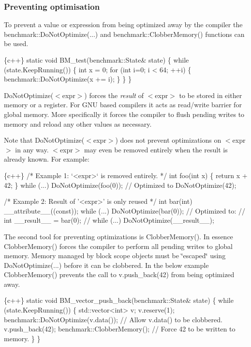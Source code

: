 \subsubsection*{Preventing optimisation}

To prevent a value or expression from being optimized away by the compiler the {\ttfamily benchmark\+::\+Do\+Not\+Optimize(...)} and {\ttfamily benchmark\+::\+Clobber\+Memory()} functions can be used.


\begin{DoxyCode}
\{c++\}
static void BM\_test(benchmark::State& state) \{
  while (state.KeepRunning()) \{
      int x = 0;
      for (int i=0; i < 64; ++i) \{
        benchmark::DoNotOptimize(x += i);
      \}
  \}
\}
\end{DoxyCode}


{\ttfamily Do\+Not\+Optimize($<$expr$>$)} forces the {\itshape result} of {\ttfamily $<$expr$>$} to be stored in either memory or a register. For G\+NU based compilers it acts as read/write barrier for global memory. More specifically it forces the compiler to flush pending writes to memory and reload any other values as necessary.

Note that {\ttfamily Do\+Not\+Optimize($<$expr$>$)} does not prevent optimizations on {\ttfamily $<$expr$>$} in any way. {\ttfamily $<$expr$>$} may even be removed entirely when the result is already known. For example\+:


\begin{DoxyCode}
\{c++\}
  /* Example 1: `<expr>` is removed entirely. */
  int foo(int x) \{ return x + 42; \}
  while (...) DoNotOptimize(foo(0)); // Optimized to DoNotOptimize(42);

  /*  Example 2: Result of '<expr>' is only reused */
  int bar(int) \_\_attribute\_\_((const));
  while (...) DoNotOptimize(bar(0)); // Optimized to:
  // int \_\_result\_\_ = bar(0);
  // while (...) DoNotOptimize(\_\_result\_\_);
\end{DoxyCode}


The second tool for preventing optimizations is {\ttfamily Clobber\+Memory()}. In essence {\ttfamily Clobber\+Memory()} forces the compiler to perform all pending writes to global memory. Memory managed by block scope objects must be \char`\"{}escaped\char`\"{} using {\ttfamily Do\+Not\+Optimize(...)} before it can be clobbered. In the below example {\ttfamily Clobber\+Memory()} prevents the call to {\ttfamily v.\+push\+\_\+back(42)} from being optimized away.


\begin{DoxyCode}
\{c++\}
static void BM\_vector\_push\_back(benchmark::State& state) \{
  while (state.KeepRunning()) \{
    std::vector<int> v;
    v.reserve(1);
    benchmark::DoNotOptimize(v.data()); // Allow v.data() to be clobbered.
    v.push\_back(42);
    benchmark::ClobberMemory(); // Force 42 to be written to memory.
  \}
\}
\end{DoxyCode}


